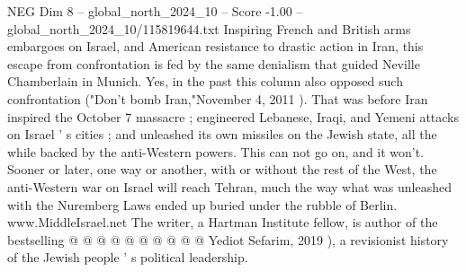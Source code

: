 \begin{textsample}{NEG Dim 8 – global\_north\_2024\_10 – Score -1.00 – global\_north\_2024\_10/115819644.txt}
Inspiring French and British arms embargoes on Israel, and American resistance to drastic action in Iran, this escape from confrontation is fed by the same denialism that guided Neville Chamberlain in Munich.
Yes, in the past this column also opposed such confrontation ("Don't bomb Iran,"November 4, 2011 ).
That was before Iran inspired the October 7 massacre ; engineered Lebanese, Iraqi, and Yemeni attacks on Israel ' s cities ; and unleashed its own missiles on the Jewish state, all the while backed by the anti-Western powers.
This can not go on, and it won't.
Sooner or later, one way or another, with or without the rest of the West, the anti-Western war on Israel will reach Tehran, much the way what was unleashed with the Nuremberg Laws ended up buried under the rubble of Berlin. www.MiddleIsrael.net The writer, a Hartman Institute fellow, is author of the bestselling @ @ @ @ @ @ @ @ @ @ Yediot Sefarim, 2019 ), a revisionist history of the Jewish people ' s political leadership.

\end{textsample}

